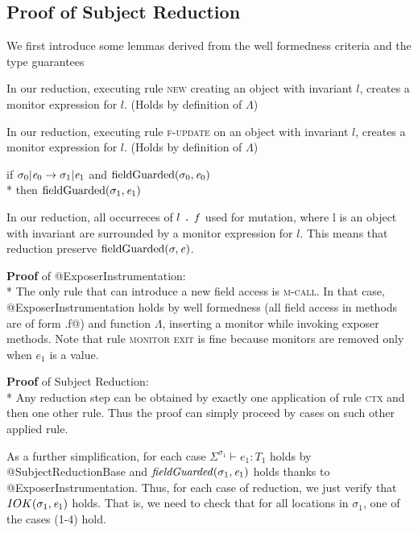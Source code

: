 \subsection{Proof of Subject Reduction}
We first introduce some lemmas
derived from the well formedness criteria and the type guarantees
\begin{Lemma}[ConstructorInstrumentation]
  In our reduction, executing rule \textsc{new} creating an object with invariant $l$, creates a monitor expression for $l$.
(Holds by definition of $\Lambda$)
\end{Lemma}
\begin{Lemma}[SetterInstrumentation]
  In our reduction, executing rule \textsc{f-update} on an object with invariant $l$, creates a monitor expression for $l$.
(Holds by definition of $\Lambda$)
\end{Lemma}
\begin{Lemma}[ExposerInstrumentation]
if $\sigma_0 | \e_0\rightarrow \sigma_1 |\e_1$ and
$\text{fieldGuarded}(\sigma_0,\e_0)$
\\*
then $\text{fieldGuarded}(\sigma_1,\e_1)$

  In our reduction, all occurreces of $l{ \mbox{ {\texttt{.}} } }\mathit{f}$ used for mutation, 
  where l is an object with invariant
   are surrounded by a monitor expression for $l$.
  This means that reduction preserve $\text{fieldGuarded}(\sigma,\e)$.
\end{Lemma}
\noindent\textbf{Proof }of @ExposerInstrumentation:\\*
The only rule that can 
introduce a new field access is \textsc{m-call}.
In that case, @ExposerInstrumentation holds
by well formedness (all field access in methods are of form \Q@this.f@)
 and function $\Lambda$, inserting a monitor while invoking exposer methods.
Note that rule \textsc{monitor exit} is fine because monitors are removed only when
 $e_1$ is a value.

\noindent\textbf{Proof }of Subject Reduction:\\*
Any reduction step can be obtained
by exactly one application of rule \textsc{ctx} and then one other rule.
Thus the proof can simply proceed by cases on such other applied rule.

As a further simplification, for each case 
$\Sigma^{\sigma_1}\vdash e_1: T_1$ holds by @SubjectReductionBase
and 
$\mathit{fieldGuarded}(\sigma_1,\e_1)$ 
holds thanks to @ExposerInstrumentation.
Thus, for each case of reduction, we just verify that $IOK(\sigma_1,\e_1)$ holds.
That is, we need to check that for all locations in $\sigma_1$, one of the cases (1-4) hold.


